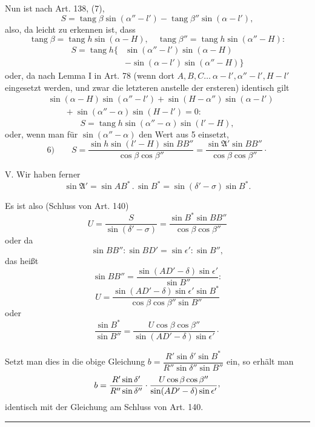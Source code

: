 Nun ist nach Art. 138, (7),
\[
S=\operatorname{tang}\beta\sin(\alpha''-l')-\operatorname{tang}\beta''\sin(\alpha-l'),
\]
also, da leicht zu erkennen ist, dass
\[
\operatorname{tang}\beta=\operatorname{tang}h\sin(\alpha-H),\quad\operatorname{tang}\beta''=\operatorname{tang}h\sin(\alpha''-H):
\]
\[
\begin{aligned}
S=\operatorname{tang}h\{&\sin(\alpha''-l')\sin(\alpha-H)\\
&-\sin(\alpha-l')\sin(\alpha''-H)\}
\end{aligned}
\]
oder, da nach Lemma I in Art. 78 (wenn dort \(A,B,C\ldots\ \alpha-l',\alpha''-l',H-l'\) eingesetzt werden, und zwar die letzteren anstelle der ersteren) identisch gilt
\[
\begin{aligned}
&\sin(\alpha-H)\sin(\alpha''-l')+\sin(H-\alpha'')\sin(\alpha-l')\\
&\qquad+\sin(\alpha''-\alpha)\sin(H-l')=0:
\end{aligned}
\]
\[
S=\operatorname{tang}h\sin(\alpha''-\alpha)\sin(l'-H),
\]
oder, wenn man für \(\sin(\alpha''-\alpha)\) den Wert aus 5 einsetzt,
\[
6)\qquad S=\frac{\sin h\sin(l'-H)\sin BB''}{\cos\beta\cos\beta''}=\frac{\sin\mathfrak{A}'\sin BB''}{\cos\beta\cos\beta''}\mathpunct{\cdot}
\]

V. Wir haben ferner
\[
\sin\mathfrak{A}'=\sin AB^*\mathbin{.}\sin B^*=\sin(\delta'-\sigma)\sin B^*.
\]

Es ist also (Schluss von Art. 140)
\[
U=\frac{S}{\sin(\delta'-\sigma)}=\frac{\sin B^*\sin BB''}{\cos\beta\cos\beta''}
\]
oder da
\[
\sin BB'':\sin BD'=\sin\epsilon':\sin B'',
\]
das heißt
\[
\sin BB''=\frac{\sin(AD'-\delta)\sin\epsilon'}{\sin B''}:
\]
\[
U=\frac{\sin(AD'-\delta)\sin\epsilon'\sin B^*}{\cos\beta\cos\beta''\sin B''}
\]
oder
\[
\frac{\sin B^*}{\sin B''}=\frac{U\cos\beta\cos\beta''}{\sin(AD'-\delta)\sin\epsilon'}\mathpunct{\cdot}
\]

Setzt man dies in die obige Gleichung \(b=\dfrac{R'\sin\delta'\sin B^*}{R''\sin\delta''\sin B''}\) ein, so erhält man
\[
b=\frac{R'\sin\delta'}{R''\sin\delta''}\cdot\frac{U\cos\beta\cos\beta''}{\sin(AD'-\delta)\sin\epsilon'}\mathpunct{\raisebox{.45ex}{,}}
\]
identisch mit der Gleichung am Schluss von Art. 140.
\begin{center}\rule{.18\textwidth}{.35pt}\end{center}
